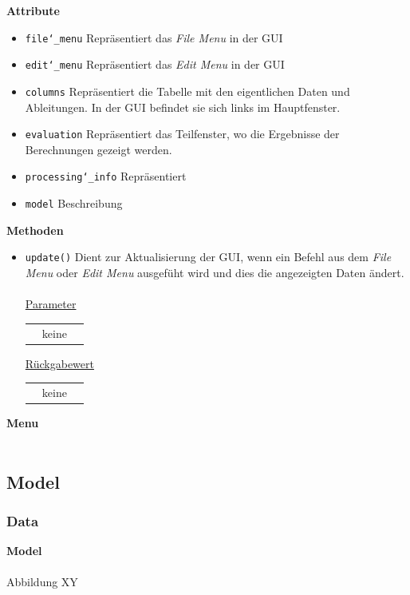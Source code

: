 \documentclass{article}
\begin{document}
\textbf{{Attribute}}
\begin{itemize}
\item \texttt{file\char`_menu} \newline Repräsentiert das \textit{File Menu} in der GUI
\item \texttt{edit\char`_menu} \newline Repräsentiert das \textit{Edit Menu} in der GUI
\item \texttt{columns} \newline Repräsentiert die Tabelle mit den eigentlichen Daten und Ableitungen. In der GUI befindet sie sich links im Hauptfenster.
\item \texttt{evaluation} \newline Repräsentiert das Teilfenster, wo die Ergebnisse der Berechnungen gezeigt werden.
\item \texttt{processing\char`_info} \newline Repräsentiert 
\item \texttt{model} \newline Beschreibung
\end{itemize}

\textbf{{Methoden}}
\begin{itemize}
\item \texttt{update()} \newline Dient zur Aktualisierung der GUI, wenn ein Befehl aus dem \textit{File Menu} oder \textit{Edit Menu} ausgefüht wird und dies die angezeigten Daten ändert.
\\\\
\underline{{Parameter}}
\begin{tabular}{lll}
 & keine \\
\end{tabular}

\underline{{Rückgabewert}}
\begin{tabular}{lll}
 & keine \\
\end{tabular}
\end{itemize}

\newpage
\textbf{\large{Menu}}\\\\


\newpage
\subsection{Model}
\subsubsection{Data}
\textbf{\large{Model}}\\\\
Abbildung XY
\end{document}
